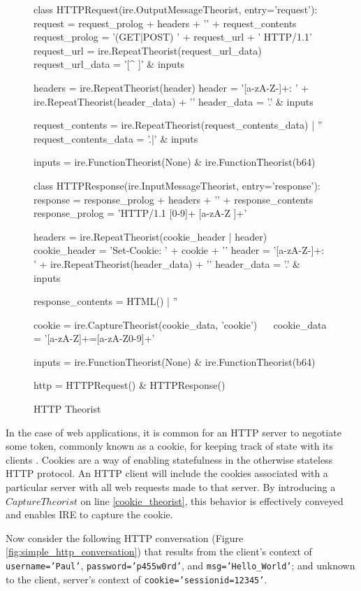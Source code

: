 \begin{figure}[H]
\begin{pythoncode}
class HTTPRequest(ire.OutputMessageTheorist, entry='request'):
    request = request_prolog + headers + '\n' + request_contents
    request_prolog = '(GET|POST) ' + request_url + ' HTTP/1.1\n'
    request_url = ire.RepeatTheorist(request_url_data)
    request_url_data = '[^ ]' & inputs

    headers = ire.RepeatTheorist(header)
    header = '[a-zA-Z-]+: ' + ire.RepeatTheorist(header_data) + '\n'
    header_data = '.' & inputs

    request_contents = ire.RepeatTheorist(request_contents_data) | ''
    request_contents_data = '.|\n' & inputs

    inputs = ire.FunctionTheorist(None) & ire.FunctionTheorist(b64)


class HTTPResponse(ire.InputMessageTheorist, entry='response'):
    response = response_prolog + headers + '\n' + response_contents
    response_prolog = 'HTTP/1.1 [0-9]+ [a-zA-Z ]+\n'

    headers = ire.RepeatTheorist(cookie_header | header)
    cookie_header = 'Set-Cookie: ' + cookie + '\n'
    header = '[a-zA-Z-]+: ' + ire.RepeatTheorist(header_data) + '\n'
    header_data = '.' & inputs

    response_contents = HTML() | ''

    cookie = ire.CaptureTheorist(cookie_data, 'cookie') ~$\label{cookie_theorist}$~
    cookie_data = '[a-zA-Z]+=[a-zA-Z0-9]+'

    inputs = ire.FunctionTheorist(None) & ire.FunctionTheorist(b64)


http = HTTPRequest() & HTTPResponse()
\end{pythoncode}
\caption{HTTP Theorist}
\label{fig:http_theorist}
\end{figure}

In the case of web applications, it is common for an HTTP server to negotiate some token, commonly known as a cookie, for keeping track of state with its clients \cite{barth2011rfc}.
Cookies are a way of enabling statefulness in the otherwise stateless HTTP protocol.
An HTTP client will include the cookies associated with a particular server with all web requests made to that server.
By introducing a $CaptureTheorist$ on line \ref{cookie_theorist}, this behavior is effectively conveyed and enables IRE to capture the cookie.

Now consider the following HTTP conversation (Figure \ref{fig:simple_http_conversation}) that results from the client's context of \texttt{username='Paul'}, \texttt{password='p455w0rd'}, and \texttt{msg='Hello_World'}; and unknown to the client, server's context of \texttt{cookie='sessionid=12345'}.

